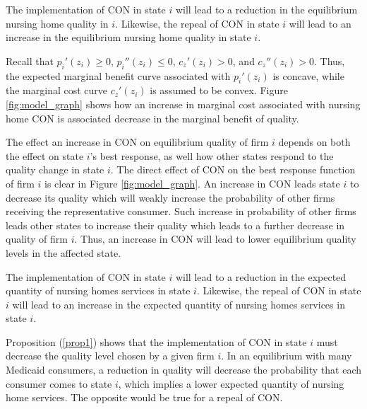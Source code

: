 \documentclass[../Main.tex]{subfiles}
\begin{document}


\begin{Proposition}\label{prop1}
The implementation of CON in state $i$ will lead to a reduction in the equilibrium nursing home quality in $i$. Likewise, the repeal of CON in state $i$ will lead to an increase in the equilibrium nursing home quality in state $i$. 
\end{Proposition}


Recall that $p_{i}'(z_i)\geq 0$, $p_{i}''(z_i) \leq 0$, $c_z'(z_i)>0$, and $c_z''(z_i)>0$. Thus, the expected marginal benefit curve associated with $p_{i}'(z_i)$ is concave, while the marginal cost curve $c_z'(z_i)$ is assumed to be convex. Figure \ref{fig:model_graph} shows how an increase in marginal cost associated with nursing home CON is associated decrease in the marginal benefit of quality. 

The effect an increase in CON on equilibrium quality of firm $i$ depends on both the effect on state $i$'s best response, as well how other states respond to the quality change in state $i$. The direct effect of CON on the best response function of firm $i$ is clear in Figure \ref{fig:model_graph}. An increase in CON leads state $i$ to decrease its quality which will weakly increase the probability of other firms receiving the representative consumer. Such increase in probability of other firms leads other states to increase their quality which leads to a further decrease in quality of firm $i$. Thus, an increase in CON will lead to lower equilibrium quality levels in the affected state. 


\begin{Proposition}\label{prop2}
The implementation of CON in state $i$ will lead to a reduction in the expected quantity of nursing homes services in state $i$. Likewise, the repeal of CON in state $i$ will lead to an increase in the expected quantity of nursing homes services in state $i$. 
\end{Proposition}

Proposition (\ref{prop1}) shows that the implementation of CON in state $i$ must decrease the quality level chosen by a given firm $i$. In an equilibrium with many Medicaid consumers, a reduction in quality will decrease the probability that each consumer comes to state $i$, which implies a lower expected quantity of nursing home services. The opposite would be true for a repeal of CON. 
\end{document}
